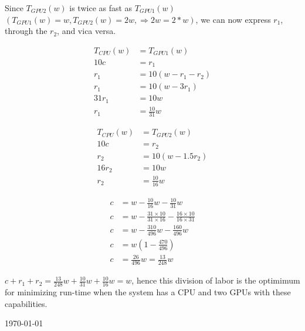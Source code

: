 \documentclass[fontsize=11pt, paper=a4, titlepage]{article}
\begin{document}
\begin{enumerate}[a)]
Since $T_{GPU2}(w)$ is twice as fast as $T_{GPU1}(w)$ $(T_{GPU1}(w) = w,
T_{GPU2}(w) = 2w, \Rightarrow 2w = 2*w)$, we can now express $r_1$, through the
$r_2$, and vica versa.

        \begin{align*}
            T_{CPU}(w) &= T_{GPU1}(w) \\
            10c &= r_1 \\
            r_1 &= 10(w - r_1 - r_2) \\
            r_1 &= 10(w - 3r_1) \\
            31r_1 &= 10w \\
            r_1 &= \frac{10}{31}w
        \end{align*}

        \begin{align*}
            T_{CPU}(w) &= T_{GPU2}(w) \\
            10c &= r_2 \\
            r_2 &= 10(w - 1.5r_2) \\
            16r_2 &= 10w \\
            r_2 &= \frac{10}{16}w
        \end{align*}

        \begin{align*}
            c &= w - \frac{10}{16}w - \frac{10}{31}w \\
            c &= w - \frac{31\times 10}{31\times 16} - \frac{16\times 10}
{16\times 31} \\
            c &= w - \frac{310}{496}w - \frac{160}{496}w \\
            c &= w(1-\frac{470}{496}) \\
            c &= \frac{26}{496}w = \frac{13}{248}w
        \end{align*}

        $c + r_1 + r_2 = \frac{13}{248}w + \frac{10}{31}w + \frac{10}{16}w = w$,
hence this division of labor is the optimimum for minimizing run-time when the
system has a CPU and two GPUs with these capabilities.

    \end{enumerate}

\vfill
\hfill \large{\today}
\end{document}
